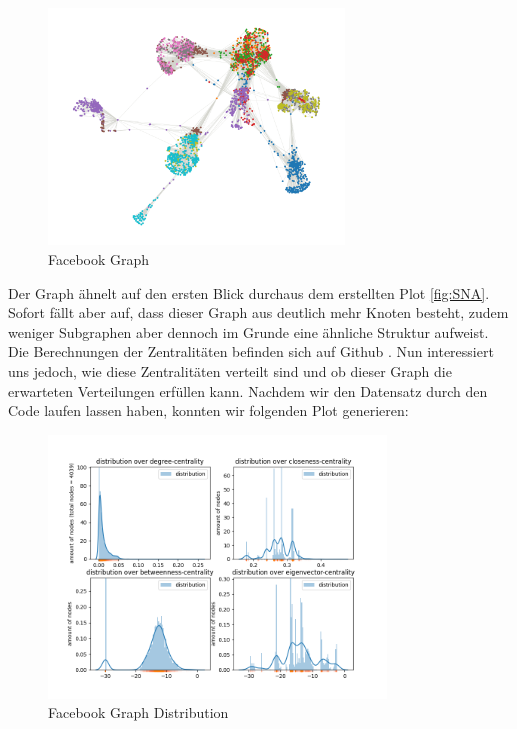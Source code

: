 \FloatBarrier
\begin{figure}[h!]%
  \centering
 \includegraphics[width=0.7\textwidth]{Graphics/FacebookPoliticalPlot.png}
  \caption{Facebook Graph}
  \label{fig:FacebookGraph}
\end{figure}
\FloatBarrier



Der Graph ähnelt auf den ersten Blick durchaus dem erstellten Plot \ref{fig:SNA}. Sofort fällt aber auf, dass dieser Graph aus deutlich mehr Knoten besteht, zudem weniger Subgraphen aber dennoch im Grunde eine ähnliche Struktur aufweist. Die Berechnungen der Zentralitäten befinden sich auf Github \cite{TZ}. Nun interessiert uns jedoch, wie diese Zentralitäten verteilt sind und ob dieser Graph die erwarteten Verteilungen erfüllen kann. Nachdem wir den Datensatz durch den Code laufen lassen haben, konnten wir folgenden Plot generieren:

\FloatBarrier
\begin{figure}[h!]%
  \centering
\includegraphics[width=0.8\textwidth]{Graphics/facebookLOG.png}
  \caption{Facebook Graph Distribution}
  \label{fig:FacebookGraphDistribution}
\end{figure}
\FloatBarrier


